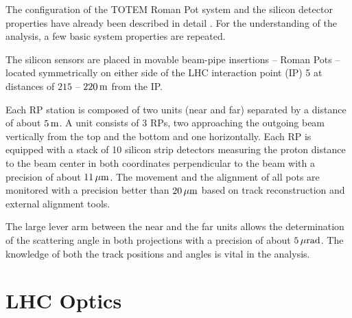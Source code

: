 \documentclass[doublecol]{../macros/epl2}
\def\un#1{\,{\rm #1}}
\begin{document}
The configuration of the TOTEM Roman Pot system and the silicon detector properties have already been described in detail \cite{jinst,epl95,epl96}. For the understanding of the analysis, a few basic  system  properties are repeated. 

The silicon sensors are placed in movable beam-pipe insertions -- Roman Pots -- located symmetrically on either side of the LHC interaction point (IP) 5 at distances of $215$ -- $220\un{m}$ from the IP.

Each RP station is composed of two units (near and far) separated by a distance of about $5\un{m}$. A unit consists of 3 RPs, two approaching the outgoing beam vertically from the top and the bottom and one horizontally. Each RP is equipped with a stack of 10 silicon strip detectors measuring the proton distance to the beam center in both coordinates perpendicular to the beam with a precision of about $11\un{\mu m}$.
The movement and the alignment of all pots are monitored with a precision better than $20\un{\mu m}$ based on track reconstruction and external alignment tools.

The large lever arm between the near and the far units allows the determination of the scattering angle in both projections with a precision of about $5\un{\mu rad}$. The knowledge of both the track positions and angles is vital in the analysis. 



\section{LHC Optics}
\end{document}
